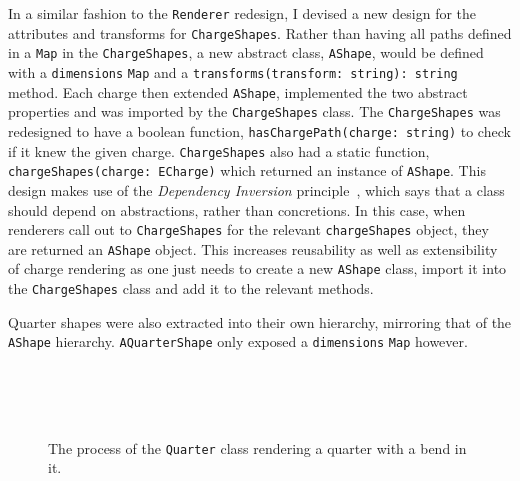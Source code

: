 \documentclass[nobib, a4paper, twoside, justified]{tufte-book}
\begin{document}
In a similar fashion to the \texttt{Renderer} redesign, I devised a new design for the attributes
and transforms for \texttt{ChargeShapes}. Rather than having all paths defined in a \texttt{Map} in
the \texttt{ChargeShapes}, a new abstract class, \texttt{AShape}, would be defined with a
\texttt{dimensions} \texttt{Map} and a \texttt{transforms(transform: string): string} method. Each
charge then extended \texttt{AShape}, implemented the two abstract properties and was imported by
the \texttt{ChargeShapes} class. The \texttt{ChargeShapes} was redesigned to have a boolean
function, \texttt{hasChargePath(charge: string)} to check if it knew the given charge.
\texttt{ChargeShapes} also had a static function, \texttt{chargeShapes(charge: ECharge)} which
returned an instance of \texttt{AShape}. This design makes use of the \textit{Dependency Inversion}
principle~\autocite{martin2000design}, which says that a class should depend on abstractions,
rather than concretions. In this case, when renderers call out to \texttt{ChargeShapes} for the
relevant \texttt{chargeShapes} object, they are returned an \texttt{AShape} object. This increases
reusability as well as extensibility of charge rendering as one just needs to create a new
\texttt{AShape} class, import it into the \texttt{ChargeShapes} class and add it to the relevant
methods.

Quarter shapes were also extracted into their own hierarchy, mirroring that of the \texttt{AShape}
hierarchy. \texttt{AQuarterShape} only exposed a \texttt{dimensions} \texttt{Map} however.


\begin{figure}
  \centering
  \qquad
  \\
  \qquad
  \\
  \qquad
  \\
  \caption{The process of the \texttt{Quarter} class rendering a quarter with a bend in it.}%
  \label{fig:quarter_rendering}
\end{figure}
\end{document}
